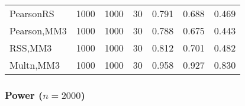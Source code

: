 \documentclass[
]{article}
\begin{document}
\begin{table}[H]
{\begin{tabular}[t]{lrrrrrr}
\hspace{1em}PearsonRS & 1000 & 1000 & 30 & 0.791 & 0.688 & 0.469\\
\hspace{1em}Pearson,MM3 & 1000 & 1000 & 30 & 0.788 & 0.675 & 0.443\\
\hspace{1em}RSS,MM3 & 1000 & 1000 & 30 & 0.812 & 0.701 & 0.482\\
\hspace{1em}Multn,MM3 & 1000 & 1000 & 30 & 0.958 & 0.927 & 0.830\\
\bottomrule
\end{tabular}}
\end{table}

\hypertarget{power-n2000-1}{%
\subsubsection{\texorpdfstring{Power
(\(n=2000\))}{Power (n=2000)}}\label{power-n2000-1}}
\end{document}
